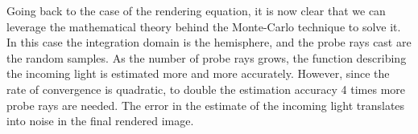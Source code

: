 \documentclass{PoliMi_MasterThesis}
\begin{document}
Going back to the case of the rendering equation, it is now clear that we can leverage the mathematical theory behind the Monte-Carlo technique to solve it. In this case the integration domain is the hemisphere, and the probe rays cast are the random samples. As the number of probe rays grows, the function describing the incoming light is estimated more and more accurately. However, since the rate of convergence is quadratic, to double the estimation accuracy 4 times more probe rays are needed. The error in the estimate of the incoming light translates into noise in the final rendered image.

\begin{figure}[H]
    \centering
	\qquad
\end{figure}
\end{document}
